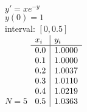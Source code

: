 {
$y' = xe^{-y}$\\
$y(0)=1$\\
interval: $[0,0.5]$\\
$N=5$
}
{
	$\begin{array}[b]{l | l}
		x_i & y_i    \\ \hline
		0.0 & 1.0000 \\
		0.1 & 1.0000 \\
		0.2 & 1.0037 \\
		0.3 & 1.0110 \\
		0.4 & 1.0219 \\
		0.5 & 1.0363
	\end{array}$
}